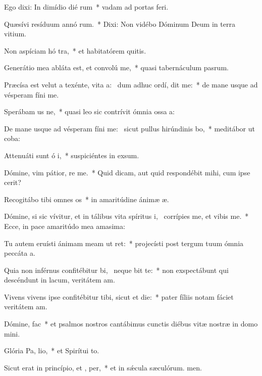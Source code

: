 \item Ego dixi: In dimídio dié rum~* vadam ad portas feri.
\item Quæsívi resíduum annó rum.~* Dixi: Non vidébo Dóminum Deum in terra vitium.
\item Non aspíciam hó tra,~* et habitatórem quitis.
\item Generátio mea abláta est, et convolú   me,~* quasi tabernáculum pasrum.
\item Præcísa est velut a texénte, vita a:~\pscross{} dum adhuc ordí, dit me:~* de mane usque ad vésperam fíni me.
\item Sperábam us  ne,~* quasi leo sic contrívit ómnia ossa a:
\item De mane usque ad vésperam fíni me:~\pscross{} sicut pullus hirúndinis  bo,~* meditábor ut coba:
\item Attenuáti sunt ó i,~* suspiciéntes in exsum.
\item Dómine, vim pátior, re  me.~* Quid dicam, aut quid respondébit mihi, cum ipse cerit?
\item Recogitábo tibi omnes  os~* in amaritúdine ánimæ æ.
\item Dómine, si sic vívitur, et in tálibus vita spíritus i,~\pscross{} corrípies me, et vibis me.~* Ecce, in pace amaritúdo mea amasima:
\item Tu autem eruísti ánimam meam ut  ret:~* projecísti post tergum tuum ómnia peccáta a.
\item Quia non inférnus confitébitur bi,~\pscross{} neque  bit te:~* non exspectábunt qui descéndunt in lacum, veritátem am.
\item Vivens vivens ipse confitébitur tibi, sicut et  die:~* pater fíliis notam fáciet veritátem am.
\item Dómine,   fac~* et psalmos nostros cantábimus cunctis diébus vitæ nostræ in domo mini.
\item Glória Pa,  lio,~* et Spirítui to.
\item Sicut erat in princípio, et ,  per,~* et in sǽcula sæculórum. men.
